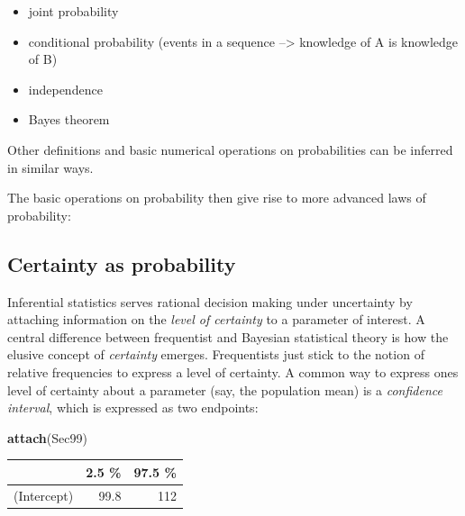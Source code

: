 \documentclass[]{svmono}
\newenvironment{Shaded}{\begin{snugshade}}{\end{snugshade}}
\newcommand{\KeywordTok}[1]{\textcolor[rgb]{0.13,0.29,0.53}{\textbf{#1}}}
\newcommand{\DataTypeTok}[1]{\textcolor[rgb]{0.13,0.29,0.53}{#1}}
\newcommand{\DecValTok}[1]{\textcolor[rgb]{0.00,0.00,0.81}{#1}}
\newcommand{\StringTok}[1]{\textcolor[rgb]{0.31,0.60,0.02}{#1}}
\newcommand{\OperatorTok}[1]{\textcolor[rgb]{0.81,0.36,0.00}{\textbf{#1}}}
\newcommand{\NormalTok}[1]{#1}
\providecommand{\tightlist}{%
  \setlength{\itemsep}{0pt}\setlength{\parskip}{0pt}}
\theoremstyle{definition}
\theoremstyle{definition}
\theoremstyle{definition}
\theoremstyle{remark}
\begin{document}
\begin{itemize}
\tightlist
\item
  joint probability
\item
  conditional probability (events in a sequence --\textgreater{}
  knowledge of A is knowledge of B)
\item
  independence
\item
  Bayes theorem
\end{itemize}

Other definitions and basic numerical operations on probabilities can be
inferred in similar ways.

The basic operations on probability then give rise to more advanced laws
of probability:

\subsection{Certainty as probability}\label{certainty-as-probability}

Inferential statistics serves rational decision making under uncertainty
by attaching information on the \emph{level of certainty} to a parameter
of interest. A central difference between frequentist and Bayesian
statistical theory is how the elusive concept of \emph{certainty}
emerges. Frequentists just stick to the notion of relative frequencies
to express a level of certainty. A common way to express ones level of
certainty about a parameter (say, the population mean) is a
\emph{confidence interval}, which is expressed as two endpoints:

\begin{Shaded}
\begin{Highlighting}[]
\KeywordTok{attach}\NormalTok{(Sec99)}
\end{Highlighting}
\end{Shaded}

\begin{Shaded}
\end{Shaded}

\begin{tabular}{l|r|r}
\hline
  & 2.5 \% & 97.5 \%\\
\hline
(Intercept) & 99.8 & 112\\
\hline
\end{tabular}
\end{document}
